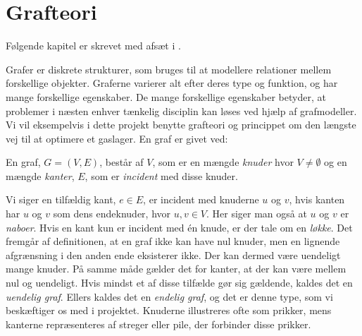 \chapter{Grafteori}
Følgende kapitel er skrevet med afsæt i \citep{dmat}.

Grafer er diskrete strukturer, som bruges til at modellere relationer mellem forskellige objekter.  Graferne varierer alt efter deres type og funktion, og har mange forskellige egenskaber. De mange forskellige egenskaber betyder, at problemer i næsten enhver tænkelig disciplin kan løses ved hjælp af grafmodeller. Vi vil eksempelvis i dette projekt benytte grafteori og princippet om den længste vej til at optimere et gaslager. En graf er givet ved:
\begin{defn}[Graf]
En graf, $G = (V,E)$, består af $V$, som er en mængde \emph{knuder} hvor $V \neq \emptyset$ og en mængde \emph{kanter}, $E$, som er \emph{incident} med disse knuder. 
\end{defn}

Vi siger en tilfældig kant, $e \in E$, er incident med knuderne $u$ og $v$, hvis kanten har $u$ og $v$ som dens endeknuder, hvor $u, v \in V$. Her siger man også at $u$ og $v$ er \emph{naboer}. Hvis en kant kun er incident med én knude, er der tale om en \emph{løkke}.
Det fremgår af definitionen, at en graf ikke kan have nul knuder, men en lignende afgrænsning i den anden ende eksisterer ikke. Der kan dermed være uendeligt mange knuder. På samme måde gælder det for kanter, at der kan være mellem nul og uendeligt. Hvis mindst et af disse tilfælde gør sig gældende, kaldes det en \emph{uendelig graf}. Ellers kaldes det en \emph{endelig graf}, og det er denne type, som vi beskæftiger os med i projektet.
Knuderne illustreres ofte som prikker, mens kanterne repræsenteres af streger eller pile, der forbinder disse prikker. 















